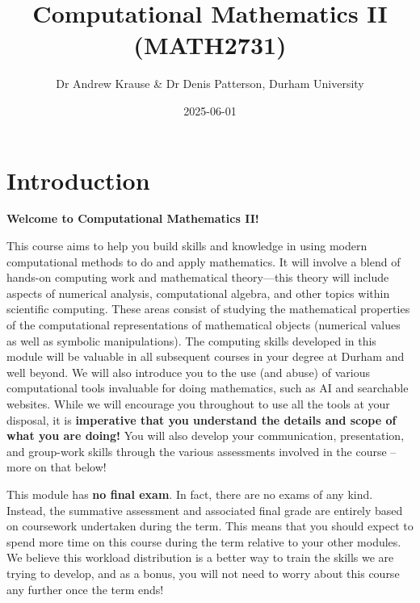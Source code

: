 \documentclass[
  letterpaper,
  DIV=11,
  numbers=noendperiod]{scrreprt}
\title{Computational Mathematics II (MATH2731)}
\author{Dr Andrew Krause \& Dr Denis Patterson, Durham University}
\date{2025-06-01}
\renewcommand*\contentsname{Table of contents}
\newcommand\contentsname{Table of contents}
\begin{document}
\maketitle

\renewcommand*\contentsname{Table of contents}
{
\hypersetup{linkcolor=}
\setcounter{tocdepth}{2}
\tableofcontents
}


\chapter*{Introduction}\label{introduction}


\textbf{Welcome to Computational Mathematics II!}

This course aims to help you build skills and knowledge in using modern
computational methods to do and apply mathematics. It will involve a
blend of hands-on computing work and mathematical theory---this theory
will include aspects of numerical analysis, computational algebra, and
other topics within scientific computing. These areas consist of
studying the mathematical properties of the computational
representations of mathematical objects (numerical values as well as
symbolic manipulations). The computing skills developed in this module
will be valuable in all subsequent courses in your degree at Durham and
well beyond. We will also introduce you to the use (and abuse) of
various computational tools invaluable for doing mathematics, such as AI
and searchable websites. While we will encourage you throughout to use
all the tools at your disposal, it is \textbf{imperative that you
understand the details and scope of what you are doing!} You will also
develop your communication, presentation, and group-work skills through
the various assessments involved in the course -- more on that below!

This module has \textbf{no final exam}. In fact, there are no exams of
any kind. Instead, the summative assessment and associated final grade
are entirely based on coursework undertaken during the term. This means
that you should expect to spend more time on this course during the term
relative to your other modules. We believe this workload distribution is
a better way to train the skills we are trying to develop, and as a
bonus, you will not need to worry about this course any further once the
term ends!
\end{document}

